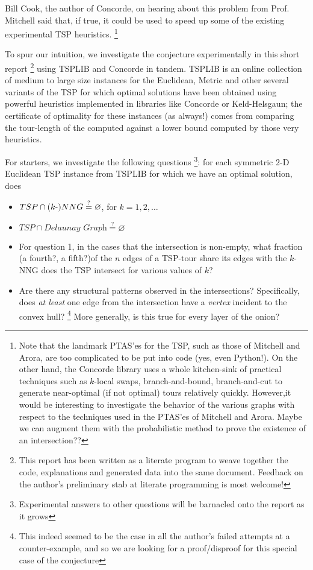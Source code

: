 \begin{description}
     Bill Cook, the author of Concorde\cite{applegate2009certification},  on hearing about this problem from Prof. Mitchell said that, if true, it could be used 
     to speed up some of the existing experimental TSP heuristics.  
     \footnote{Note that the landmark PTAS'es for the TSP, such as those of Mitchell \cite{mitchell1999guillotine} and Arora\cite{arora1996polynomial},  are too complicated to be put into code (yes, even Python!). On the other hand, the Concorde library uses a whole kitchen-sink of practical techniques such as $k$-local swaps, branch-and-bound, branch-and-cut to generate  near-optimal (if not optimal) tours relatively quickly. However,it would be interesting to investigate the behavior of the various graphs with respect to the techniques used in the PTAS'es of Mitchell and Arora. Maybe we can augment them with the probabilistic method to prove the existence of an intersection??}

     To spur our intuition,  we investigate the conjecture experimentally in this short report 
     \footnote{This report has been written as a literate program \cite{knuth1984literate,ramsey2008noweb} to weave together the code, explanations and generated data into the same document. Feedback on the author's preliminary stab at literate programming is most welcome!}
     using TSPLIB and Concorde in tandem. TSPLIB is an online collection of medium to large size instances for the Euclidean, Metric and other several variants of the TSP 
     for which optimal solutions have been obtained using powerful heuristics implemented in libraries like Concorde or Keld-Helsgaun;
     the certificate of optimality for these instances (as always!) comes from comparing the tour-length of the computed against 
     a lower bound computed by those very heuristics. 

     For starters,  we investigate the following questions \footnote{Experimental answers to other questions will be barnacled onto the report as it grows}: 
     for each symmetric 2-D Euclidean TSP instance from TSPLIB for which we have an optimal solution, does

     \begin{itemize}
     \item $TSP \cap (k{\text -})NNG \stackrel{?}{=} \varnothing$, for $k=1,2,\ldots$
     \item $TSP \cap \textit{Delaunay Graph} \stackrel{?}{=} \varnothing$
     \item For question 1, in the cases that the intersection is non-empty, what fraction (a fourth?, a fifth?)of the $n$ 
           edges of a TSP-tour share its edges with the  $k$-NNG does the TSP intersect for various values of $k$? 
     \item Are there any structural patterns observed in the intersections? Specifically, does \textit{at least } 
           one edge from the intersection have a \textit{vertex} incident to the convex hull? \footnote{This indeed seemed to be the case in all the author's failed attempts at a counter-example, and so we are looking for a proof/disproof for this special case of the conjecture}
           More generally, is this true for every layer of the onion?
     \end{itemize}


\end{description}
